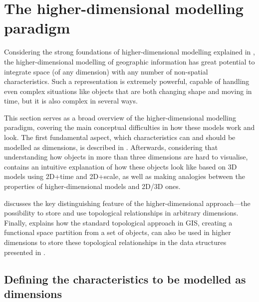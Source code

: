 \section{The higher-dimensional modelling paradigm}
\label{se:nd-modelling-paradigm}

Considering the strong foundations of higher-dimensional modelling explained in , the higher-dimensional modelling of geographic information has great potential to integrate space (of any dimension) with any number of non-spatial characteristics.
Such a representation is extremely powerful, capable of handling even complex situations like objects that are both changing shape and moving in time, but it is also complex in several ways.

This section serves as a broad overview of the higher-dimensional modelling paradigm, covering the main conceptual difficulties in how these models work and look.
The first fundamental aspect, which characteristics can and should be modelled as dimensions, is described in .
Afterwards, considering that understanding how objects in more than three dimensions are hard to visualise,  contains an intuitive explanation of how these objects look like based on 3D models using 2D+time and 2D+scale, as well as making analogies between the properties of higher-dimensional models and 2D/3D ones.

 discusses the key distinguishing feature of the higher-dimensional approach---the possibility to store and use topological relationships in arbitrary dimensions.
Finally,  explains how the standard topological approach in GIS, creating a functional space partition from a set of objects, can also be used in higher dimensions to store these topological relationships in the data structures presented in .

\subsection{Defining the characteristics to be modelled as dimensions}
\label{ss:dimensions}

